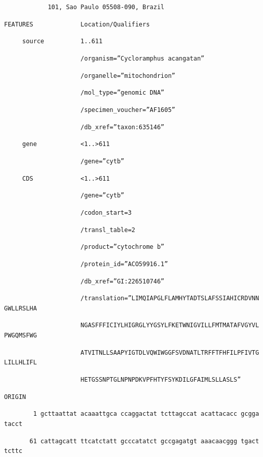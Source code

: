 \begin{refsection}
\noindent\texttt{~~~~~~~~~~~~101,~Sao~Paulo~05508-090,~Brazil}

\noindent\texttt{FEATURES~~~~~~~~~~~~~Location/Qualifiers}

\noindent\texttt{~~~~~source~~~~~~~~~~1..611}

\noindent\texttt{~~~~~~~~~~~~~~~~~~~~~/organism=''Cycloramphus~acangatan''}

\noindent\texttt{~~~~~~~~~~~~~~~~~~~~~/organelle=''mitochondrion''}

\noindent\texttt{~~~~~~~~~~~~~~~~~~~~~/mol\_type=''genomic~DNA''}

\noindent\texttt{~~~~~~~~~~~~~~~~~~~~~/specimen\_voucher=''AF1605''}

\noindent\texttt{~~~~~~~~~~~~~~~~~~~~~/db\_xref=''taxon:635146''}

\noindent\texttt{~~~~~gene~~~~~~~~~~~~<1..>611}

\noindent\texttt{~~~~~~~~~~~~~~~~~~~~~/gene=''cytb''}

\noindent\texttt{~~~~~CDS~~~~~~~~~~~~~<1..>611}

\noindent\texttt{~~~~~~~~~~~~~~~~~~~~~/gene=''cytb''}

\noindent\texttt{~~~~~~~~~~~~~~~~~~~~~/codon\_start=3}

\noindent\texttt{~~~~~~~~~~~~~~~~~~~~~/transl\_table=2}

\noindent\texttt{~~~~~~~~~~~~~~~~~~~~~/product=''cytochrome~b''}

\noindent\texttt{~~~~~~~~~~~~~~~~~~~~~/protein\_id=''ACO59916.1''}

\noindent\texttt{~~~~~~~~~~~~~~~~~~~~~/db\_xref=''GI:226510746''}

\noindent\texttt{~~~~~~~~~~~~~~~~~~~~~/translation=''LIMQIAPGLFLAMHYTADTSLAFSSIAHICRDVNNGWLLRSLHA}

\noindent\texttt{~~~~~~~~~~~~~~~~~~~~~NGASFFFICIYLHIGRGLYYGSYLFKETWNIGVILLFMTMATAFVGYVLPWGQMSFWG}

\noindent\texttt{~~~~~~~~~~~~~~~~~~~~~ATVITNLLSAAPYIGTDLVQWIWGGFSVDNATLTRFFTFHFILPFIVTGLILLHLIFL}

\noindent\texttt{~~~~~~~~~~~~~~~~~~~~~HETGSSNPTGLNPNPDKVPFHTYFSYKDILGFAIMLSLLASLS''}

\noindent\texttt{ORIGIN~~~~~~}

\noindent\texttt{~~~~~~~~1~gcttaattat~acaaattgca~ccaggactat~tcttagccat~acattacacc~gcggatacct}

\noindent\texttt{~~~~~~~61~cattagcatt~ttcatctatt~gcccatatct~gccgagatgt~aaacaacggg~tgacttcttc}


\end{refsection}
